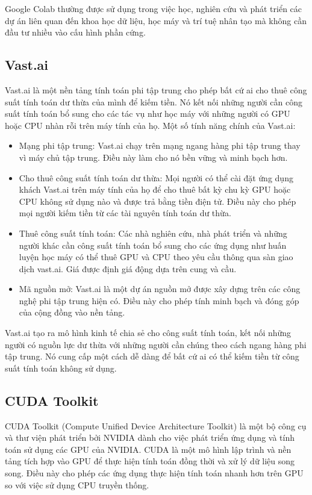 Google Colab thường được sử dụng trong việc học, nghiên cứu và phát triển các dự án liên quan đến khoa học dữ liệu, học máy và trí tuệ nhân tạo mà không cần đầu tư nhiều vào cấu hình phần cứng.

\subsection{Vast.ai}
Vast.ai là một nền tảng tính toán phi tập trung cho phép bất cứ ai cho thuê công suất tính toán dư thừa của mình để kiếm tiền. Nó kết nối những người cần công suất tính toán bổ sung cho các tác vụ như học máy với những người có GPU hoặc CPU nhàn rỗi trên máy tính của họ. Một số tính năng chính của Vast.ai:

\begin{itemize}
    \item Mạng phi tập trung: Vast.ai chạy trên mạng ngang hàng phi tập trung thay vì máy chủ tập trung. Điều này làm cho nó bền vững và minh bạch hơn.
    \item Cho thuê công suất tính toán dư thừa: Mọi người có thể cài đặt ứng dụng khách Vast.ai trên máy tính của họ để cho thuê bất kỳ chu kỳ GPU hoặc CPU không sử dụng nào và được trả bằng tiền điện tử. Điều này cho phép mọi người kiếm tiền từ các tài nguyên tính toán dư thừa.
    \item Thuê công suất tính toán: Các nhà nghiên cứu, nhà phát triển và những người khác cần công suất tính toán bổ sung cho các ứng dụng như huấn luyện học máy có thể thuê GPU và CPU theo yêu cầu thông qua sàn giao dịch vast.ai. Giá được định giá động dựa trên cung và cầu.
    \item Mã nguồn mở: Vast.ai là một dự án nguồn mở được xây dựng trên các công nghệ phi tập trung hiện có. Điều này cho phép tính minh bạch và đóng góp của cộng đồng vào nền tảng.
\end{itemize}
Vast.ai tạo ra mô hình kinh tế chia sẻ cho công suất tính toán, kết nối những người có nguồn lực dư thừa với những người cần chúng theo cách ngang hàng phi tập trung. Nó cung cấp một cách dễ dàng để bất cứ ai có thể kiếm tiền từ công suất tính toán không sử dụng.

\subsection{CUDA Toolkit}
CUDA Toolkit (Compute Unified Device Architecture Toolkit) là một bộ công cụ và thư viện phát triển bởi NVIDIA dành cho việc phát triển ứng dụng và tính toán sử dụng các GPU của NVIDIA. CUDA là một mô hình lập trình và nền tảng tích hợp vào GPU để thực hiện tính toán đồng thời và xử lý dữ liệu song song. Điều này cho phép các ứng dụng thực hiện tính toán nhanh hơn trên GPU so với việc sử dụng CPU truyền thống.

